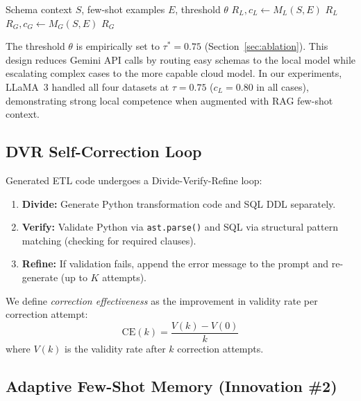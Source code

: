 \documentclass[conference]{IEEEtran}
\begin{document}
\begin{algorithm}
\caption{Confidence-Gated Routing (CGR)}
\label{alg:routing}
\begin{algorithmic}[1]
\Require Schema context $S$, few-shot examples $E$, threshold $\theta$
\State $R_L, c_L \gets M_L(S, E)$ 
    \State \Return $R_L$ 
\Else
    \State $R_G, c_G \gets M_G(S, E)$ 
    \State \Return $R_G$ 
\EndIf
\end{algorithmic}
\end{algorithm}

The threshold $\theta$ is empirically set to $\tau^*=0.75$ (Section~\ref{sec:ablation}).
This design reduces Gemini API calls by routing easy schemas to the local
model while escalating complex cases to the more capable cloud model.
In our experiments, LLaMA~3 handled all four datasets at $\tau=0.75$
($c_L=0.80$ in all cases), demonstrating strong local competence when
augmented with RAG few-shot context.

\subsection{DVR Self-Correction Loop}
\label{sec:dvr}

Generated ETL code undergoes a Divide-Verify-Refine loop:

\begin{enumerate}
\item \textbf{Divide:} Generate Python transformation code and SQL DDL
separately.
\item \textbf{Verify:} Validate Python via \texttt{ast.parse()} and SQL
via structural pattern matching (checking for required clauses).
\item \textbf{Refine:} If validation fails, append the error message to
the prompt and re-generate (up to $K$ attempts).
\end{enumerate}

We define \emph{correction effectiveness} as the improvement in validity
rate per correction attempt:
\begin{equation}
\text{CE}(k) = \frac{V(k) - V(0)}{k}
\label{eq:correction_effectiveness}
\end{equation}
where $V(k)$ is the validity rate after $k$ correction attempts.

\subsection{Adaptive Few-Shot Memory (Innovation \#2)}
\label{sec:memory}
\end{document}
